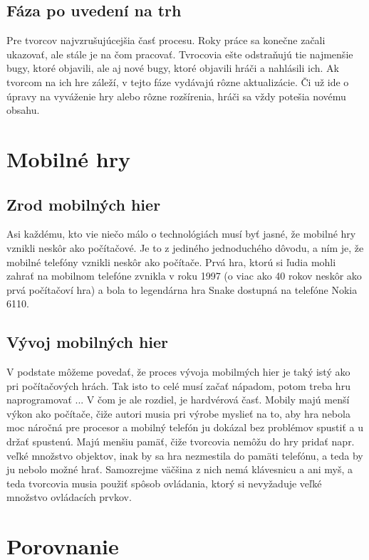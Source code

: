 \documentclass[10pt,twoside,slovak,a4paper]{article}
\begin{document}
\subsection{Fáza po uvedení na trh}
Pre tvorcov najvzrušujúcejšia časť procesu. Roky práce sa konečne začali ukazovať, ale stále je na čom pracovať. Tvrocovia ešte odstraňujú tie najmenšie bugy, ktoré objavili, ale aj nové bugy, ktoré objavili hráči a nahlásili ich. Ak tvorcom na ich hre záleží, v tejto fáze vydávajú rôzne aktualizácie. Či už ide o úpravy na vyváženie hry alebo rôzne rozšírenia, hráči sa vždy potešia novému obsahu.~\cite{1}


\section{Mobilné hry} \label{mobilne}

\subsection{Zrod mobilných hier}

Asi každému, kto vie niečo málo o technológiách musí byť jasné, že mobilné hry vznikli neskôr ako počítačové. Je to z jediného jednoduchého dôvodu, a ním je, že mobilné telefóny vznikli neskôr ako počítače. Prvá hra, ktorú si ľudia mohli zahrať na mobilnom telefóne zvnikla v roku 1997 (o viac ako 40 rokov neskôr ako prvá počítačoví hra) a bola to legendárna hra Snake dostupná na telefóne Nokia 6110.~\cite{2}

\subsection{Vývoj mobilných hier}
V podstate môžeme povedať, že proces vývoja mobilmých hier je taký istý ako pri počítačových hrách. Tak isto to celé musí začať nápadom, potom treba hru naprogramovať ... V čom je ale rozdiel, je hardvérová časť. Mobily majú menší výkon ako počítače, čiže autori musia pri výrobe myslieť na to, aby hra nebola moc náročná pre procesor a mobilný telefón ju dokázal bez problémov spustiť a u držať spustenú. Majú menšiu pamäť, čiže tvorcovia nemôžu do hry pridať napr. veľké množstvo objektov, inak by sa hra nezmestila do pamäti telefónu, a teda by ju nebolo možné hrať. Samozrejme väčšina z nich nemá klávesnicu a ani myš, a teda tvorcovia musia použiť spôsob ovládania, ktorý si nevyžaduje veľké množstvo ovládacích prvkov.

\section{Porovnanie} \label{porovnanie}
\end{document}
